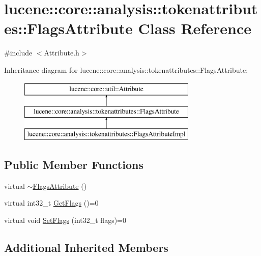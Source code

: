 \hypertarget{classlucene_1_1core_1_1analysis_1_1tokenattributes_1_1FlagsAttribute}{}\section{lucene\+:\+:core\+:\+:analysis\+:\+:tokenattributes\+:\+:Flags\+Attribute Class Reference}
\label{classlucene_1_1core_1_1analysis_1_1tokenattributes_1_1FlagsAttribute}


{\ttfamily \#include $<$Attribute.\+h$>$}

Inheritance diagram for lucene\+:\+:core\+:\+:analysis\+:\+:tokenattributes\+:\+:Flags\+Attribute\+:\begin{figure}[H]
\begin{center}
\leavevmode
\includegraphics[height=3.000000cm]{classlucene_1_1core_1_1analysis_1_1tokenattributes_1_1FlagsAttribute}
\end{center}
\end{figure}
\subsection*{Public Member Functions}
\begin{DoxyCompactItemize}
\item 
virtual \mbox{\hyperlink{classlucene_1_1core_1_1analysis_1_1tokenattributes_1_1FlagsAttribute_a09be2fa83a9b76607965596fc8264145}{$\sim$\+Flags\+Attribute}} ()
\item 
virtual int32\+\_\+t \mbox{\hyperlink{classlucene_1_1core_1_1analysis_1_1tokenattributes_1_1FlagsAttribute_af5e017643df32ab110aca8337c01006d}{Get\+Flags}} ()=0
\item 
virtual void \mbox{\hyperlink{classlucene_1_1core_1_1analysis_1_1tokenattributes_1_1FlagsAttribute_a95bb70b836e238f5134a0ba12bb01d3d}{Set\+Flags}} (int32\+\_\+t flags)=0
\end{DoxyCompactItemize}
\subsection*{Additional Inherited Members}



